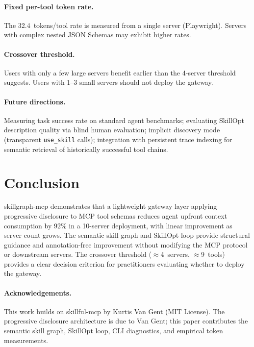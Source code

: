 \documentclass[11pt,a4paper]{article}
\begin{document}
\paragraph{Fixed per-tool token rate.}
The 32.4~tokens/tool rate is measured from a single server (Playwright). Servers
with complex nested JSON Schemas may exhibit higher rates.

\paragraph{Crossover threshold.}
Users with only a few large servers benefit earlier than the 4-server threshold
suggests. Users with 1--3 small servers should not deploy the gateway.

\paragraph{Future directions.}
Measuring task success rate on standard agent benchmarks;
evaluating SkillOpt description quality via blind human evaluation;
implicit discovery mode (transparent \texttt{use\_skill} calls);
integration with persistent trace indexing for semantic retrieval
of historically successful tool chains.

\section{Conclusion}
\label{sec:conclusion}

skillgraph-mcp demonstrates that a lightweight gateway layer applying progressive
disclosure to MCP tool schemas reduces agent upfront context consumption by 92\% in
a 10-server deployment, with linear improvement as server count grows. The semantic
skill graph and SkillOpt loop provide structural guidance and annotation-free
improvement without modifying the MCP protocol or downstream servers. The crossover
threshold ($\approx$4~servers, $\approx$9~tools) provides a clear decision criterion
for practitioners evaluating whether to deploy the gateway.

\paragraph{Acknowledgements.}
This work builds on skillful-mcp by Kurtis Van Gent (MIT License). The progressive
disclosure architecture is due to Van Gent; this paper contributes the semantic skill
graph, SkillOpt loop, CLI diagnostics, and empirical token measurements.



\end{document}
